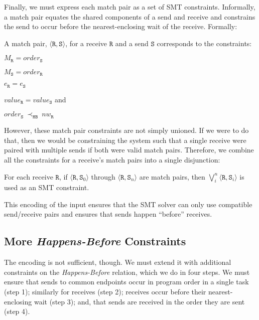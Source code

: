 Finally, we must express each match pair as a set of SMT
constraints. Informally, a match pair equates the shared components of
a send and receive and constrains the send to occur before the
nearest-enclosing wait of the receive. Formally:

\begin{definition} \label{def:match}
A match pair, $\langle\mathtt{R}, \mathtt{S}\rangle$, for a receive
$\mathtt{R}$ and a send $\mathtt{S}$ corresponds to the constraints:
\begin{compactenum}
\item $M_{\mathtt{R}} = \mathit{order}_{\mathtt{S}}$
\item $M_{\mathtt{S}} = \mathit{order}_{\mathtt{R}}$
\item $e_{\mathtt{R}} = e_{\mathtt{S}}$
\item $\mathit{value}_{\mathtt{R}} = \mathit{value}_{\mathtt{S}}$ and
\item $\mathit{order}_{\mathtt{S}}\ \mathrm{\prec_\mathtt{HB}}\ \mathit{nw}_{\mathtt{R}}$
\end{compactenum}
\end{definition}

However, these match pair constraints are not simply unioned. If we
were to do that, then we would be constraining the system such that a
single receive were paired with multiple sends if both were valid
match pairs. Therefore, we combine all the constraints for a receive's
match pairs into a single disjunction:

\begin{definition}
For each receive $\mathtt{R}$, if $\langle\mathtt{R},
\mathtt{S}_0\rangle$ through $\langle\mathtt{R}, \mathtt{S}_n\rangle$
are match pairs, then $\bigvee_{i}^{n} \langle\mathtt{R},
\mathtt{S}_i\rangle$ is used as an SMT constraint.
\end{definition}

This encoding of the input ensures that the SMT solver can only use
compatible send/receive pairs and ensures that sends happen ``before''
receives.

\subsection{More \emph{Happens-Before} Constraints}

The encoding is not sufficient, though. We must extend it with
additional constraints on the \emph{Happens-Before} relation, which we
do in four steps. We must ensure that sends to common endpoints occur
in program order in a single task (step 1); similarly for receives
(step 2); receives occur before their nearest-enclosing wait (step 3);
and, that sends are received in the order they are sent (step 4).


